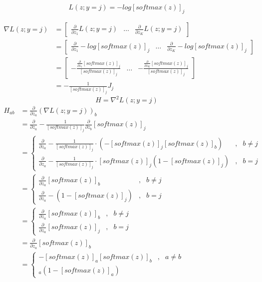 \documentclass{article}
\begin{document}
\newcommand{\softmax}[1]{ [softmax(z)]_{#1} }
\newcommand{\sumezi}{\left(\sum_{i=1}^{K} exp(z_{i}) \right)}
\newcommand{\pz}[1]{ \frac{\partial}{\partial z_{#1}}}

\begin{equation}
	L(z; y = j) = -log\softmax{j}
\end{equation}

\begin{equation}
	\begin{split}
	\nabla L(z; y=j) &=
		\left[\begin{matrix}
			\pz{1}L(z; y=j) & \dots & \pz{K}L(z;y=j)
		\end{matrix}\right] \\
	&=	\left[\begin{matrix}
			\pz{1}-log\softmax{j}
			& \dots
			& \pz{K}-log\softmax{j}
		\end{matrix}\right] \\
	&=  \left[\begin{matrix}
		-\frac{\pz{1}\softmax{j}}{\softmax{j}}
		& \dots
		& -\frac{\pz{K}\softmax{j}}{\softmax{j}}
		\end{matrix}\right] \\
	&=	-\frac{1}{\softmax{j}}J_{j}
	\end{split}
\end{equation}
\begin{equation}
	H = \nabla^{2}L(z;y=j)
\end{equation}
\begin{equation}
	\begin{split}
		H_{ab} &= \pz{a} \left( \nabla L(z;y=j)\right)_{b}\\
		&= \pz{a} -\frac{1}{\softmax{j}}
			\pz{b}\softmax{j} \\
		&= \left\{\begin{array}{lll}
				\pz{a}-\frac{1}{\softmax{j}}
					\cdot (-\softmax{j}
					\softmax{b}) & , & b \neq j \\
				\pz{a}-\frac{1}{\softmax{j}}
					\cdot \softmax{j}
							(1-\softmax{j})
									& , & b = j
			\end{array}
		   \right. \\
		&= \left\{\begin{array}{lll}
				\pz{a}\softmax{b} & , & b \neq j \\
				\pz{a}-(1-\softmax{j}) & , & b = j
				\end{array}
			\right. \\
		&= \left\{\begin{array}{lll}
				\pz{a}\softmax{b} & , & b \neq j \\
				\pz{a} \softmax{j} & , & b = j
				\end{array}
			\right. \\
		&= \pz{a}\softmax{b} \\
		&= \left\{\begin{array}{lll}
				-\softmax{a}\softmax{b} & , & a \neq b \\
				\softmax{a}(1 - \softmax{a})
				\end{array}
			\right.
	\end{split}
\end{equation}
\end{document}
